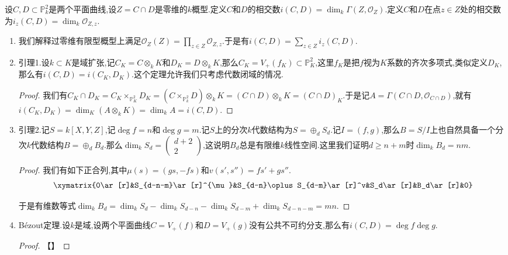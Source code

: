 设$C,D\subset\mathbb{P}_k^2$是两个平面曲线,设$Z=C\cap D$是零维的$k$概型.定义$C$和$D$的相交数$i(C,D)=\dim_k\Gamma(Z,\mathscr{O}_Z)$.定义$C$和$D$在点$z\in Z$处的相交数为$i_z(C,D)=\dim_k\mathscr{O}_{Z,z}$.
\begin{enumerate}
	\item 我们解释过零维有限型概型上满足$\mathscr{O}_Z(Z)=\prod_{z\in Z}\mathscr{O}_{Z,z}$.于是有$i(C,D)=\sum_{z\in Z}i_z(C,D)$.
	\item 引理1.设$k\subset K$是域扩张,记$C_K=C\otimes_kK$和$D_K=D\otimes_kK$,那么$C_K=V_+(f_K)\subset\mathbb{P}_K^2$,这里$f_K$是把$f$视为$K$系数的齐次多项式,类似定义$D_K$,那么有$i(C,D)=i(C_K,D_K)$.这个定理允许我们只考虑代数闭域的情况.
	\begin{proof}
		
		我们有$C_K\cap D_K=C_K\times_{\mathbb{P}_K^2}D_K=(C\times_{\mathbb{P}_k^2}D)\otimes_kK=(C\cap D)\otimes_kK=(C\cap D)_K$.于是记$A=\Gamma(C\cap D,\mathscr{O}_{C\cap D})$,就有$i(C_K,D_K)=\dim_K(A\otimes_kK)=\dim_kA=i(C,D)$.
	\end{proof}
	\item 引理2.记$S=k[X,Y,Z]$,记$\deg f=n$和$\deg g=m$.记$S$上的分次$k$代数结构为$S=\oplus_dS_d$.记$I=(f,g)$,那么$B=S/I$上也自然具备一个分次$k$代数结构$B=\oplus_dB_d$.那么$\dim_kS_d=\left(\begin{array}{c}d+2\\2\end{array}\right)$,这说明$B_d$总是有限维$k$线性空间.这里我们证明$d\ge n+m$时$\dim_kB_d=nm$.
	\begin{proof}
		
		我们有如下正合列,其中$\mu(s)=(gs,-fs)$和$v(s',s'')=fs'+gs''$.
		$$\xymatrix{0\ar[r]&S_{d-n-m}\ar[r]^{\mu}&S_{d-n}\oplus S_{d-m}\ar[r]^v&S_d\ar[r]&B_d\ar[r]&0}$$
		
		于是有维数等式$\dim_kB_d=\dim_kS_d-\dim_kS_{d-n}-\dim_kS_{d-m}+\dim_kS_{d-n-m}=mn$.
	\end{proof}
	\item B\'ezout定理.设$k$是域,设两个平面曲线$C=V_+(f)$和$D=V_+(g)$没有公共不可约分支,那么有$i(C,D)=\deg f\deg g$.
	\begin{proof}
		
		【】
	\end{proof}
\end{enumerate}





